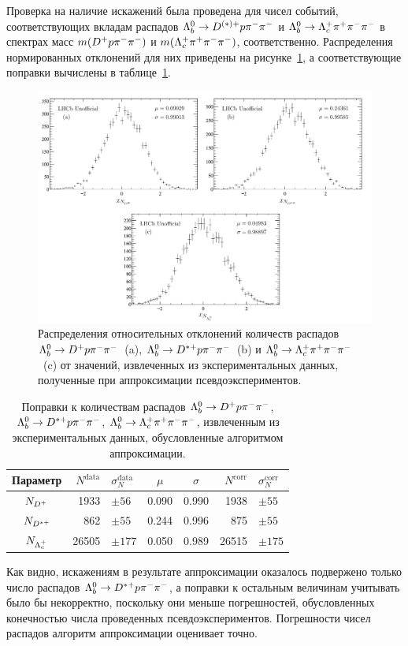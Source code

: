 Проверка на наличие искажений была проведена для чисел событий, 
соответствующих вкладам распадов $\Lb\to\Doptstarp\p\pim\pim$ 
и $\Lb\to\Lc\pip\pim\pim$ в спектрах масс $m({D^+}{p}{\pi^-}{\pi^-})$ 
и $m({\Lambda_c^+}{\pi^+}{\pi^-}{\pi^-})$, соответственно. Распределения нормированных 
отклонений для них приведены на рисунке~\ref{fig:pulls}, 
а соответствующие поправки вычислены в таблице~\ref{tab:pulls}.
%
\begin{figure}[t!]%
  \centering
  \includegraphics[width=\linewidth]{figures/toy-pulls}
  \caption{Распределения относительных отклонений количеств распадов 
  $\Lb\to\Dp\p\pim\pim$~(a), $\Lb\to\Dstarp\p\pim\pim$~(b) 
  и $\Lb\to\Lc\pip\pim\pim$~(c) от значений, извлеченных из 
  экспериментальных данных, полученные при аппроксимации 
  псевдоэкспериментов.}
  \label{fig:pulls}
\end{figure}%
%
\begin{table}%
  \centering
  \caption{Поправки к количествам распадов $\Lb\to\Dp\p\pim\pim$, 
  $\Lb\to\Dstarp\p\pim\pim$, $\Lb\to\Lc\pip\pim\pim$, извлеченным из 
  экспериментальных данных, обусловленные алгоритмом аппроксимации.}
  \label{tab:pulls}
  \begin{tabular}{|c | r|l | c|c | r|l|}
    \hline
    Параметр & $N^\text{data}$ & $\sigma_N^\text{data}$
             & $\mu$ & $\sigma$
             & $N^\text{corr}$ & $\sigma_N^\text{corr}$ \\
    \hline
    $N_{D^+}$    & 1933 & $\pm56$ & 0.090 & 0.990 & 1938 & $\pm55$ \\
    $N_{D^{*+}}$ & 862 & $\pm55$ & 0.244 & 0.996 &  875 & $\pm55$ \\
    $N_{\Lambda_c^+}$  & 26505 & $\pm177$ & 0.050 & 0.989 &26515 & $\pm175$ \\
    \hline
  \end{tabular}
\end{table}%
%
Как видно, искажениям в результате аппроксимации оказалось подвержено 
только число распадов $\Lb\to\Dstarp\p\pim\pim$, а поправки к остальным 
величинам учитывать было бы некорректно, поскольку они меньше 
погрешностей, обусловленных конечностью числа проведенных 
псевдоэкспериментов. Погрешности чисел распадов алгоритм аппроксимации 
оценивает точно.

